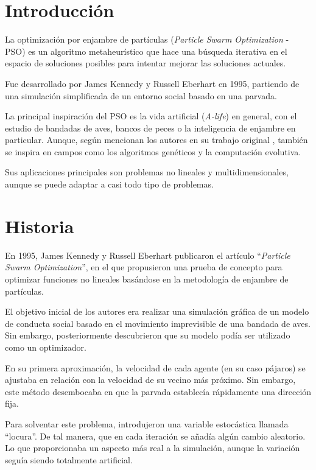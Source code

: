\documentclass[a4paper,12pt,titlepage]{article}
\begin{document}
\section{Introducción}

La optimización por enjambre de partículas (\textit{Particle Swarm Optimization} - PSO) es un algoritmo metaheurístico que hace una búsqueda iterativa en el espacio de soluciones posibles para intentar mejorar las soluciones actuales.

Fue desarrollado por James Kennedy y Russell Eberhart en 1995, partiendo de una simulación simplificada de un entorno social basado en una parvada.

La principal inspiración del PSO es la vida artificial (\textit{A-life}) en general, con el estudio de bandadas de aves, bancos de peces o la inteligencia de enjambre en particular. Aunque, según mencionan los autores en su trabajo original \citep{Kennedy1995}, también se inspira en campos como los algoritmos genéticos y la computación evolutiva.

Sus aplicaciones principales son problemas no lineales y multidimensionales, aunque se puede adaptar a casi todo tipo de problemas.

\section{Historia}

En 1995, James Kennedy y Russell Eberhart publicaron el artículo “\textit{Particle Swarm Optimization}”\citep{Kennedy1995}, en el que propusieron una prueba de concepto para optimizar funciones no lineales basándose en la metodología de enjambre de partículas. 

El objetivo inicial de los autores era realizar una simulación gráfica de un modelo de conducta social basado en el movimiento imprevisible de una bandada de aves. Sin embargo, posteriormente descubrieron que su modelo podía ser utilizado como un optimizador.

En su primera aproximación, la velocidad de cada agente (en su caso pájaros) se ajustaba en relación con la velocidad de su vecino más próximo. Sin embargo, este método desembocaba en que la parvada establecía rápidamente una dirección fija.

Para solventar este problema, introdujeron una variable estocástica llamada “locura”. De tal manera, que en cada iteración se añadía algún cambio aleatorio. Lo que proporcionaba un aspecto más real a la simulación, aunque la variación seguía siendo totalmente artificial.
\end{document}
